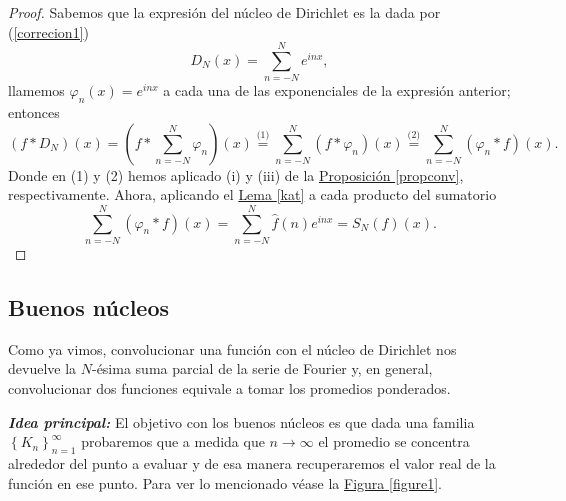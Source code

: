 \documentclass[12pt]{article}
\theoremstyle{plain}
\theoremstyle{definition}
\numberwithin{equation}{section}
\begin{document}
        \begin{proof}
            Sabemos que la expresión del núcleo de Dirichlet es la dada por (\ref{correcion1})
            \begin{equation*}
                \label{Dirichlet}
                D_N (x)= \sum_{n = -N}^{N} e^{inx},
            \end{equation*}
            llamemos \(\varphi_n(x) = e^{inx}\) a cada una de las exponenciales de la expresión anterior; entonces
            \begin{equation*}
                (f \ast D_N)(x) = \left(f \ast \sum_{n = -N}^{N} \varphi_n\right) (x) \overset{\text{(1)}}{=} \sum_{n = -N}^{N} \left(f \ast \varphi_n\right)(x) \overset{\text{(2)}}{=} \sum_{n = -N}^{N} \left(\varphi_n \ast f\right)(x).
            \end{equation*}
            Donde en (1) y (2) hemos aplicado (i) y (iii) de la \hyperref[propconv]{Proposición \ref*{propconv}}, respectivamente.
            Ahora, aplicando el \hyperref[kat]{Lema \ref*{kat}} a cada producto del sumatorio
            \begin{equation*}
                \sum_{n = -N}^{N} \left(\varphi_n \ast f\right)(x) = \sum_{n = -N}^{N} \hat{f}(n)e^{inx} = S_N(f)(x).
            \end{equation*}
        \end{proof}
    \subsection{Buenos núcleos}
        Como ya vimos, convolucionar una función con el núcleo de Dirichlet nos devuelve la \(N\)-ésima suma parcial de la serie de Fourier y, en general, convolucionar dos funciones equivale a tomar los promedios ponderados.

        \textit{\textbf{Idea principal: }}El objetivo con los buenos núcleos es que dada una familia \(\left\{K_n\right\} _{n=1}^{\infty}\) probaremos que a medida que \(n \to \infty\) el promedio se concentra alrededor del punto a evaluar y de esa manera recuperaremos el valor real de la función en ese punto. Para ver lo mencionado véase la \hyperref[figure1]{ Figura \ref*{figure1}}.
\end{document}

